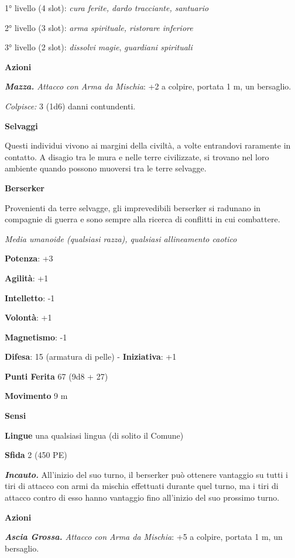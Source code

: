 \begin{multicols}{2}
1° livello (4 slot): \emph{cura ferite, dardo tracciante, santuario}

2° livello (3 slot): \emph{arma spirituale, ristorare inferiore}

3° livello (2 slot): \emph{dissolvi magie}, \emph{guardiani spirituali}

\smallskip\textbf{Azioni}

\emph{\textbf{Mazza.} Attacco con Arma da Mischia}: +2 a colpire,
portata 1 m, un bersaglio.

\emph{Colpisce:} 3 (1d6) danni contundenti.



\textbf{Selvaggi}

Questi individui vivono ai margini della civiltà, a volte entrandovi
raramente in contatto. A disagio tra le mura e nelle terre civilizzate,
si trovano nel loro ambiente quando possono muoversi tra le terre
selvagge.

\textbf{Berserker}

Provenienti da terre selvagge, gli imprevedibili berserker si radunano
in compagnie di guerra e sono sempre alla ricerca di conflitti in cui
combattere.

\emph{Media umanoide (qualsiasi razza), qualsiasi allineamento caotico}

\textbf{Potenza}: +3

\textbf{Agilità}: +1

\textbf{Intelletto}: -1

\textbf{Volontà}: +1

\textbf{Magnetismo}: -1

\textbf{Difesa}: 15 (armatura di pelle) - \textbf{Iniziativa}: +1

\textbf{Punti Ferita} 67 (9d8 + 27)

\textbf{Movimento} 9 m

\textbf{Sensi} 

\textbf{Lingue} una qualsiasi lingua (di solito il Comune)

\textbf{Sfida} 2 (450 PE)\smallskip

\emph{\textbf{Incauto.}} All'inizio del suo turno, il berserker può
ottenere vantaggio su tutti i tiri di attacco con armi da mischia
effettuati durante quel turno, ma i tiri di attacco contro di esso hanno
vantaggio fino all'inizio del suo prossimo turno.

\smallskip\textbf{Azioni}

\emph{\textbf{Ascia Grossa.} Attacco con Arma da Mischia}: +5 a colpire,
portata 1 m, un bersaglio.


\end{multicols}
